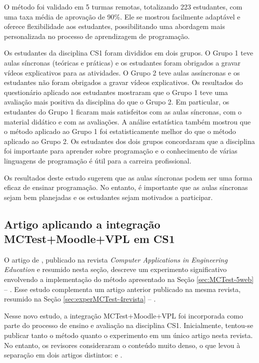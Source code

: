 O método foi validado em 5 turmas remotas, totalizando 223 estudantes, com uma taxa média de aprovação de 90\%. Ele se mostrou facilmente adaptável e oferece flexibilidade aos estudantes, possibilitando uma abordagem mais personalizada no processo de aprendizagem de programação.

Os estudantes da disciplina CS1 foram divididos em dois grupos. O Grupo 1 teve aulas síncronas (teóricas e práticas) e os estudantes foram obrigados a gravar vídeos explicativos para as atividades. O Grupo 2 teve aulas assíncronas e os estudantes não foram obrigados a gravar vídeos explicativos. Os resultados do questionário aplicado aos estudantes mostraram que o Grupo 1 teve uma avaliação mais positiva da disciplina do que o Grupo 2. Em particular, os estudantes do Grupo 1 ficaram mais satisfeitos com as aulas síncronas, com o material didático e com as avaliações. A análise estatística também mostrou que o método aplicado ao Grupo 1 foi estatisticamente melhor do que o método aplicado ao Grupo 2.
%
Os estudantes dos dois grupos concordaram que a disciplina foi importante para aprender sobre programação e o conhecimento de várias linguagens de programação é útil para a carreira profissional.

Os resultados deste estudo sugerem que as aulas síncronas podem ser uma forma eficaz de ensinar programação. No entanto, é importante que as aulas síncronas sejam bem planejadas e os estudantes sejam motivados a participar.

\subsection{Artigo aplicando a integração MCTest+Moodle+VPL em CS1}\label{sec:revistaCAE21}

O artigo de , publicado na revista \textit{Computer Applications in Engineering Education} e resumido nesta seção, descreve um experimento significativo envolvendo a implementação do método apresentado na Seção \ref{sec:MCTest-5web} --  \cite{2020:Zampirolli.Pisani.ea}. Esse estudo complementa um artigo anterior publicado na mesma revista, resumido na Seção \ref{sec:experMCTest-4revista} --  \cite{2018:Zampirolli.Goya.ea}.

Nesse novo estudo, a integração MCTest+Moodle+VPL foi incorporada como parte do processo de ensino e avaliação na disciplina CS1. Inicialmente, tentou-se publicar tanto o método quanto o experimento em um único artigo nesta revista. No entanto, os revisores consideraram o conteúdo muito denso, o que levou à separação em dois artigos distintos:  e .


